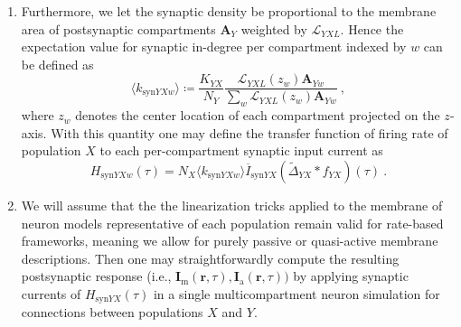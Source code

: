 \begin{enumerate}
\item Furthermore, we let the synaptic density be proportional to the membrane area of postsynaptic compartments $\mathbf{A}_Y$ weighted by $\mathcal{L}_{YXL}$.
Hence the expectation value for synaptic in-degree per compartment indexed by $w$ can be defined as
\begin{equation}
\langle k_{\mathrm{syn}YXw} \rangle \coloneq \frac{K_{YX}}{N_Y} \frac{ \mathcal{L}_{YXL}(z_w) \mathbf{A}_{Yw}}{\sum_w \mathcal{L}_{YXL}(z_w) \mathbf{A}_{Yw}} ~,
\end{equation}
where $z_w$ denotes the center location of each compartment projected on the $z$-axis.
With this quantity one may define the transfer function  of firing rate of population $X$ to each per-compartment synaptic input current as
\begin{equation}
H_{\mathrm{syn}YXw}(\tau) = N_X \langle k_{\mathrm{syn}YXw} \rangle \overline{I}_{\mathrm{syn}YX} \left( \widetilde{\Delta}_{YX} \ast f_{YX}\right)(\tau) ~.
\end{equation}

\item We will assume that the the linearization tricks applied to the membrane of neuron models representative of each population remain valid for rate-based frameworks,
meaning we allow for purely passive or quasi-active membrane descriptions.
Then one may straightforwardly compute the resulting postsynaptic response
(i.e., $\mathbf{I}_\mathrm{m}(\mathbf{r}, \tau),{}\mathbf{I}_\mathrm{a}(\mathbf{r}, \tau))$
by applying synaptic currents of $H_{\mathrm{syn}YX}(\tau)$ in a single multicompartment neuron simulation for connections between populations $X$ and $Y$.


\end{enumerate}
